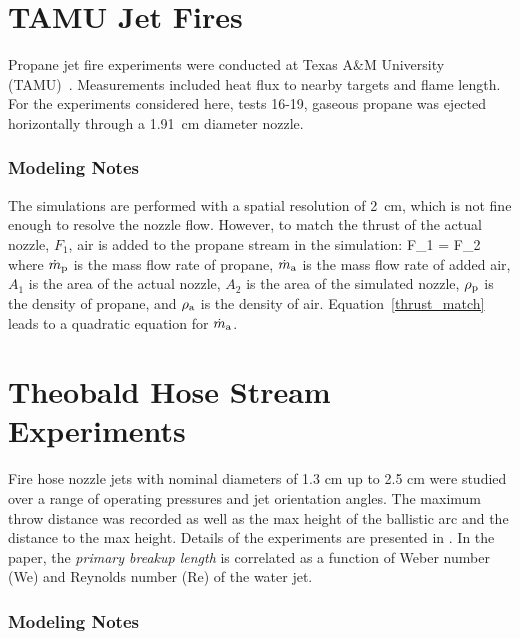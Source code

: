 \section{TAMU Jet Fires}
\label{TAMU_Jet_Fires_Description}

Propane jet fire experiments were conducted at Texas A\&M University (TAMU)~\cite{Zhang:IEC2015}. Measurements included heat flux to nearby targets and flame length. For the experiments considered here, tests 16-19, gaseous propane was ejected horizontally through a 1.91~cm diameter nozzle. 

\subsubsection{Modeling Notes}

The simulations are performed with a spatial resolution of 2~cm, which is not fine enough to resolve the nozzle flow. However, to match the thrust of the actual nozzle, $F_1$, air is added to the propane stream in the simulation:
\be
   F_1 \equiv {}
   =  \equiv F_2 \label{thrust_match}
\ee
where $\dot{m}_{\rm p}$ is the mass flow rate of propane, $\dot{m}_{\rm a}$ is the mass flow rate of added air, $A_1$ is the area of the actual nozzle, $A_2$ is the area of the simulated nozzle, $\rho_{\rm p}$ is the density of propane, and $\rho_{\rm a}$ is the density of air. Equation~\ref{thrust_match} leads to a quadratic equation for $\dot{m}_{\rm a}$.


\section{Theobald Hose Stream Experiments}
\label{Theobald_Description}

Fire hose nozzle jets with nominal diameters of 1.3 cm up to 2.5 cm were studied over a range of operating pressures and jet orientation angles.  The maximum throw distance was recorded as well as the max height of the ballistic arc and the distance to the max height.  Details of the experiments are presented in \cite{Theobald:1981}.  In the paper, the \emph{primary breakup length} is correlated as a function of Weber number (We) and Reynolds number (Re) of the water jet.

\subsubsection{Modeling Notes}

